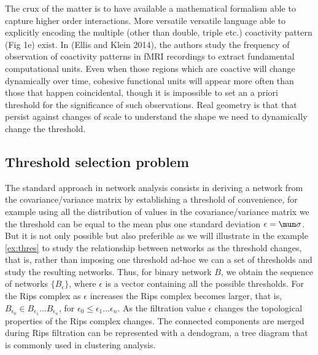 \documentclass[onecollarge,runningheads]{svjour2}
\begin{document}
The crux of the matter is to have available a mathematical formalism able to capture higher order interactions. More versatile versatile language able to explicitly encoding the multiple (other than double, triple etc.) coactivity pattern (Fig 1e) exist. 
In (Ellis and Klein 2014), the authors study the frequency of observation of coactivity patterns in fMRI recordings to extract fundamental computational units. Even when those regions which are coactive will change dynamically over time, cohesive functional units will appear more often than those that happen coincidental, though it is impossible to set an a priori threshold for the significance of such observations.
Real geometry is that that persist against changes of scale to understand the shape we need to dynamically change the threshold.

\begin{example}
\label{ex:dyadic}
\end{example}

\subsection{Threshold selection problem}
\label{sec:ph}

The standard approach in network analysis consists in deriving a network from the covariance/variance matrix by establishing a threshold of convenience, for example using all the distribution of values in the covariance/variance matrix we the threshold can be equal to the mean plus one  standard deviation $\epsilon = \mun\sigma$. But it is not only possible but also preferible as we will illustrate in the example \ref{ex:thres} to study the relationship between networks as the threshold changes, that is, rather than imposing one threshold ad-hoc we can a set of thresholds and study the resulting networks. Thus, for binary network $B$, we obtain the sequence of networks $\{B_{\epsilon}\}$, where $\epsilon$ is a vector containing all the possible thresholds. For the Rips complex as $\epsilon$ increases the Rips complex becomes larger, that is, $B_{\epsilon_0} \in B_{\epsilon_1} ... B_{\epsilon_n}$, for $\epsilon_0 \leq \epsilon_1 ...\epsilon_n$. As the filtration value $\epsilon$ changes the topological properties of the Rips complex changes. 
The connected components are merged during Rips filtration can be represented with a dendogram, a tree diagram that is commonly used in clustering analysis.
\end{document}
